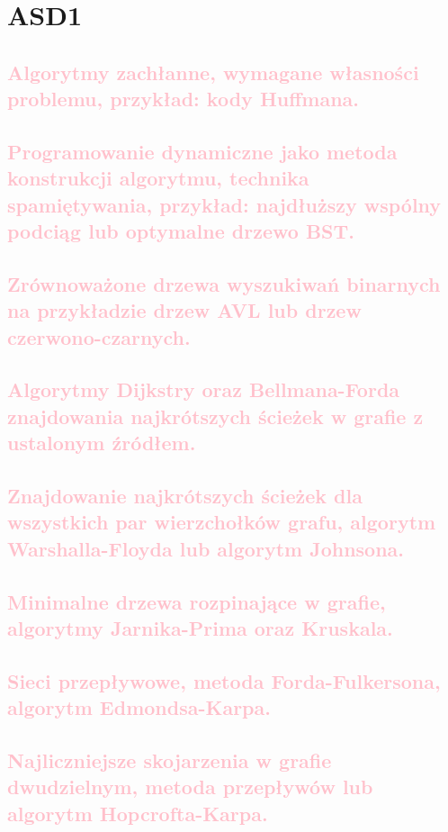 \chapter{ASD1}

\section{\textcolor{pink}{Algorytmy zachłanne, wymagane własności problemu, przykład: kody Huffmana.}}

\section{\textcolor{pink}{Programowanie dynamiczne jako metoda konstrukcji algorytmu, technika spamiętywania, przykład: najdłuższy wspólny podciąg lub optymalne drzewo BST.}}

\section{\textcolor{pink}{Zrównoważone drzewa wyszukiwań binarnych na przykładzie drzew AVL lub drzew czerwono-czarnych.}}

\section{\textcolor{pink}{Algorytmy Dijkstry oraz Bellmana-Forda znajdowania najkrótszych ścieżek w grafie z ustalonym źródłem.}}

\section{\textcolor{pink}{Znajdowanie najkrótszych ścieżek dla wszystkich par wierzchołków grafu, algorytm Warshalla-Floyda lub algorytm Johnsona.}}

\section{\textcolor{pink}{Minimalne drzewa rozpinające w grafie, algorytmy Jarnika-Prima oraz Kruskala.}}

\section{\textcolor{pink}{Sieci przepływowe, metoda Forda-Fulkersona, algorytm Edmondsa-Karpa.}}

\section{\textcolor{pink}{Najliczniejsze skojarzenia w grafie dwudzielnym, metoda przepływów lub algorytm Hopcrofta-Karpa.}}